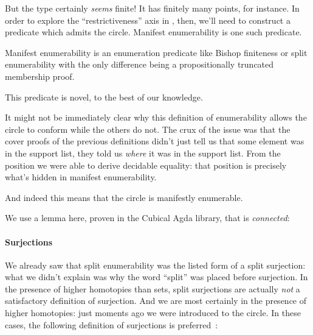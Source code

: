 But the type certainly \emph{seems} finite!
It has finitely many points, for instance.
In order to explore the ``restrictiveness'' axis in
, then, we'll need to construct a predicate
which admits the circle.
Manifest enumerability is one such predicate.
\begin{definition}
  Manifest enumerability is an enumeration predicate like Bishop finiteness or
  split enumerability with the only difference being a propositionally truncated
  membership proof.
  \begin{agdalisting*}
  \end{agdalisting*}
\end{definition}
This predicate is novel, to the best of our knowledge.

It might not be immediately clear why this definition of enumerability allows
the circle to conform while the others do not.
The crux of the issue was that the cover proofs of the previous definitions
didn't just tell us that some element was in the support list, they told us
\emph{where} it was in the support list.
From the position we were able to derive decidable equality: that position is
precisely what's hidden in manifest enumerability.

And indeed this means that the circle is manifestly enumerable.
\begin{agdalisting*}
\end{agdalisting*}
We use a lemma here, proven in the Cubical Agda library, that
 is \emph{connected}:
\begin{agdalisting*}
\end{agdalisting*}
\paragraph{Surjections}
We already saw that split enumerability was the listed form of a split
surjection: what we didn't explain was why the word ``split'' was placed before
surjection.
In the presence of higher homotopies than sets, split surjections are actually
\emph{not} a satisfactory definition of surjection.
And we are most certainly in the presence of higher homotopies: just moments ago
we were introduced to the circle.
In these cases, the following definition of surjections is
preferred~\cite[definition 4.6.1]{hottbook}:
\begin{agdalisting}\label{surj-eqn}
  \begin{multicols}{2}
     \columnbreak
  \end{multicols}
\end{agdalisting}

